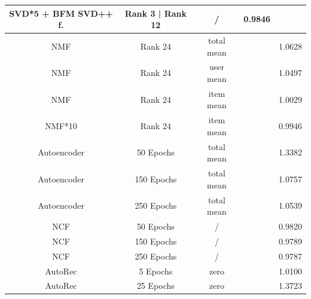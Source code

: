 \documentclass[10pt,conference,compsocconf]{IEEEtran}
\begin{document}
\begin{table}
{\begin{tabular}{|| c | c | c | c | c ||}
                SVD*5 + BFM SVD++ f. & Rank 3 | Rank 12                      & /                        & 0.9846                 &                         \\
                \hline
                NMF                  & Rank 24                               & total mean              &                        & 1.0628                  \\
                NMF                  & Rank 24                               & user mean               &                        & 1.0497                  \\
                NMF                  & Rank 24                               & item mean               &                        & 1.0029                  \\
                NMF*10               & Rank 24                               & item mean               &                        & 0.9946                  \\
                \hline
                Autoencoder          & 50 Epochs                             & total mean              &                        & 1.3382                  \\
                Autoencoder          & 150 Epochs                            & total mean              &                        & 1.0757                  \\
                Autoencoder          & 250 Epochs                            & total mean              &                        & 1.0539                  \\
                \hline
                NCF                  & 50 Epochs                             & /                       &                        & 0.9820                  \\
                NCF                  & 150 Epochs                            & /                       &                        & 0.9789                  \\
                NCF                  & 250 Epochs                            & /                       &                        & 0.9787                  \\
                \hline
                AutoRec              & 5 Epochs                              & zero                    &                        & 1.0100                  \\
                AutoRec              & 25 Epochs                             & zero                    &                        & 1.3723                  \\

\end{tabular}}
\end{table}
\end{document}
